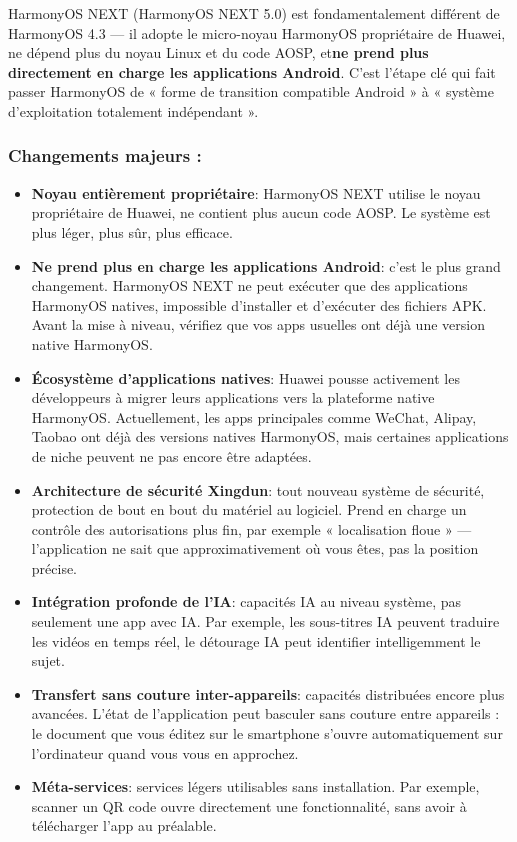 
HarmonyOS NEXT (HarmonyOS NEXT 5.0) est fondamentalement différent de HarmonyOS 4.3 — il adopte le micro-noyau HarmonyOS propriétaire de Huawei, ne dépend plus du noyau Linux et du code AOSP, et\textbf{ne prend plus directement en charge les applications Android}. C'est l'étape clé qui fait passer HarmonyOS de « forme de transition compatible Android » à « système d'exploitation totalement indépendant ».

\subsubsection*{Changements majeurs :}

\begin{itemize}
  \item \textbf{Noyau entièrement propriétaire}: HarmonyOS NEXT utilise le noyau propriétaire de Huawei, ne contient plus aucun code AOSP. Le système est plus léger, plus sûr, plus efficace.
  \item \textbf{Ne prend plus en charge les applications Android}: c'est le plus grand changement. HarmonyOS NEXT ne peut exécuter que des applications HarmonyOS natives, impossible d'installer et d'exécuter des fichiers APK. Avant la mise à niveau, vérifiez que vos apps usuelles ont déjà une version native HarmonyOS.
  \item \textbf{Écosystème d'applications natives}: Huawei pousse activement les développeurs à migrer leurs applications vers la plateforme native HarmonyOS. Actuellement, les apps principales comme WeChat, Alipay, Taobao ont déjà des versions natives HarmonyOS, mais certaines applications de niche peuvent ne pas encore être adaptées.
  \item \textbf{Architecture de sécurité Xingdun}: tout nouveau système de sécurité, protection de bout en bout du matériel au logiciel. Prend en charge un contrôle des autorisations plus fin, par exemple « localisation floue » — l'application ne sait que approximativement où vous êtes, pas la position précise.
  \item \textbf{Intégration profonde de l'IA}: capacités IA au niveau système, pas seulement une app avec IA. Par exemple, les sous-titres IA peuvent traduire les vidéos en temps réel, le détourage IA peut identifier intelligemment le sujet.
  \item \textbf{Transfert sans couture inter-appareils}: capacités distribuées encore plus avancées. L'état de l'application peut basculer sans couture entre appareils : le document que vous éditez sur le smartphone s'ouvre automatiquement sur l'ordinateur quand vous vous en approchez.
  \item \textbf{Méta-services}: services légers utilisables sans installation. Par exemple, scanner un QR code ouvre directement une fonctionnalité, sans avoir à télécharger l'app au préalable.
\end{itemize}


